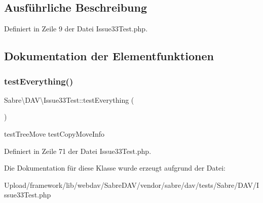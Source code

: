 \subsection{Ausführliche Beschreibung}


Definiert in Zeile 9 der Datei Issue33\+Test.\+php.



\subsection{Dokumentation der Elementfunktionen}
\mbox{\label{class_sabre_1_1_d_a_v_1_1_issue33_test_aaa9bfe87de0cd229954d6c61c99a4532}} 
\subsubsection{\texorpdfstring{test\+Everything()}{testEverything()}}
{\footnotesize\ttfamily Sabre\textbackslash{}\+D\+A\+V\textbackslash{}\+Issue33\+Test\+::test\+Everything (\begin{DoxyParamCaption}{ }\end{DoxyParamCaption})}

test\+Tree\+Move  test\+Copy\+Move\+Info 

Definiert in Zeile 71 der Datei Issue33\+Test.\+php.



Die Dokumentation für diese Klasse wurde erzeugt aufgrund der Datei\+:\begin{DoxyCompactItemize}
\item 
Upload/framework/lib/webdav/\+Sabre\+D\+A\+V/vendor/sabre/dav/tests/\+Sabre/\+D\+A\+V/Issue33\+Test.\+php\end{DoxyCompactItemize}
